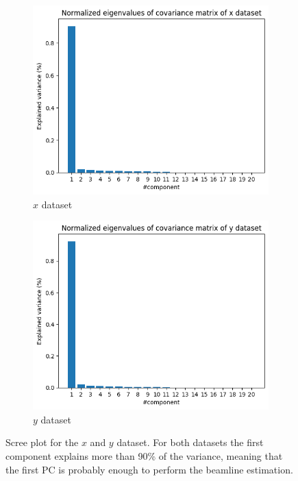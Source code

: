 \begin{figure}
    \centering
    \begin{subfigure}{0.48\textwidth}
    \includegraphics[width=\linewidth]{figures/x_eigenvalues.png}
    \caption{$x$ dataset}\label{fig:x_eigenvalues}
    \end{subfigure}
    \begin{subfigure}{0.48\textwidth}
    \includegraphics[width=\linewidth]{figures/y_eigenvalues.png}
    \caption{$y$ dataset}\label{fig:y_eigenvalues}
    \end{subfigure}
    \caption{Scree plot for the $x$ and $y$ dataset. For both datasets the first component explains more than 90\% of the variance, meaning that the first PC is probably enough to perform the beamline estimation.}
    \label{fig:scree_plot}
\end{figure}

